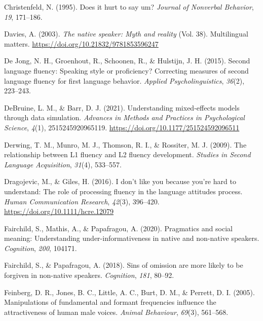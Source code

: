 \documentclass[
  man,floatsintext]{apa7}
\newlength{\cslhangindent}
\newlength{\cslentryspacingunit} %
\newenvironment{CSLReferences}[2] %
 {%
  \setlength{\parindent}{0pt}
  \ifodd #1
  \let\oldpar\par
  \def\par{\hangindent=\cslhangindent\oldpar}
  \fi
  \setlength{\parskip}{#2\cslentryspacingunit}
 }%
 {}
\begin{document}
\begin{CSLReferences}{1}{0}
\leavevmode{}%
Christenfeld, N. (1995). Does it hurt to say um? \emph{Journal of Nonverbal Behavior}, \emph{19}, 171--186.

\leavevmode{}%
Davies, A. (2003). \emph{The native speaker: Myth and reality} (Vol. 38). Multilingual matters. \url{https://doi.org/10.21832/9781853596247}

\leavevmode{}%
De Jong, N. H., Groenhout, R., Schoonen, R., \& Hulstijn, J. H. (2015). Second language fluency: Speaking style or proficiency? Correcting measures of second language fluency for first language behavior. \emph{Applied Psycholinguistics}, \emph{36}(2), 223--243.

\leavevmode{}%
DeBruine, L. M., \& Barr, D. J. (2021). Understanding mixed-effects models through data simulation. \emph{Advances in Methods and Practices in Psychological Science}, \emph{4}(1), 2515245920965119. \url{https://doi.org/10.1177/251524592096511}

\leavevmode{}%
Derwing, T. M., Munro, M. J., Thomson, R. I., \& Rossiter, M. J. (2009). The relationship between L1 fluency and L2 fluency development. \emph{Studies in Second Language Acquisition}, \emph{31}(4), 533--557.

\leavevmode{}%
Dragojevic, M., \& Giles, H. (2016). I don't like you because you're hard to understand: The role of processing fluency in the language attitudes process. \emph{Human Communication Research}, \emph{42}(3), 396--420. \url{https://doi.org/10.1111/hcre.12079}

\leavevmode{}%
Fairchild, S., Mathis, A., \& Papafragou, A. (2020). Pragmatics and social meaning: Understanding under-informativeness in native and non-native speakers. \emph{Cognition}, \emph{200}, 104171.

\leavevmode{}%
Fairchild, S., \& Papafragou, A. (2018). Sins of omission are more likely to be forgiven in non-native speakers. \emph{Cognition}, \emph{181}, 80--92.

\leavevmode{}%
Feinberg, D. R., Jones, B. C., Little, A. C., Burt, D. M., \& Perrett, D. I. (2005). Manipulations of fundamental and formant frequencies influence the attractiveness of human male voices. \emph{Animal Behaviour}, \emph{69}(3), 561--568.


\end{CSLReferences}
\end{document}

